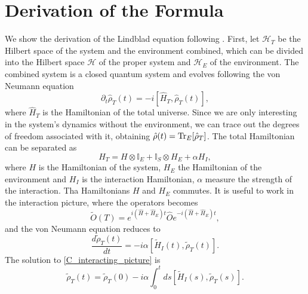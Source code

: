 \section{Derivation of the Formula}
We show the derivation of the Lindblad equation following \cite{Manzano,Breuer-Petruccione}.
First, let $\mathcal{H}_T$ be the Hilbert space of the system and the environment combined, which can be divided into the Hilbert space $\mathcal{H}$ of the proper system and $\mathcal{H}_E$ of the environment. The combined system is a closed quantum system and evolves following the von Neumann equation 
\begin{equation}
    \partial_t\hat\rho_T(t) = -i[\hat H_T,\hat\rho_T(t)],
\end{equation}
where $\hat H_T$ is the Hamiltonian of the total universe.
Since we are only interesting in the system's dynamics without the environment, we can trace out the degrees of freedom associated with it, obtaining $\hat\rho(t) = \operatorname{Tr}_E[\hat\rho_T]$. The total Hamiltonian can be separated as 
\begin{equation}
    H_T = H \otimes \mathbb{I}_E + \mathbb{I}_S \otimes H_E + \alpha H_I,
\end{equation}
where $H$ is the Hamiltonian of the system, $H_E$ the Hamiltonian of the environment and $H_I$ is the interaction Hamiltonian, $\alpha$  measure the strength of the interaction. Tha Hamiltonians $H$ and $H_E$ commutes.
It is useful to work in the interaction picture, where the operators becomes
\begin{equation}
    \tilde O(T) = e^{i(\hat H+\hat H_E)t}\hat O e^{-i(\hat H+\hat H_E)t},
\end{equation}
and the von Neumann equation reduces to 
\begin{equation}\label{C_interacting_picture}
    \frac{d\tilde\rho_T(t)}{dt}= -i\alpha\left[\tilde H_I(t),\tilde\rho_T(t)\right].
\end{equation}  
The solution to \eqref{C_interacting_picture} is 
\begin{equation}\label{interacting_picture_exact_solution}
    \tilde\rho_T(t) = \tilde\rho_T(0) -i\alpha\int_{0}^{t}ds\left[\tilde H_I(s),\tilde\rho_T(s)\right].
\end{equation}

